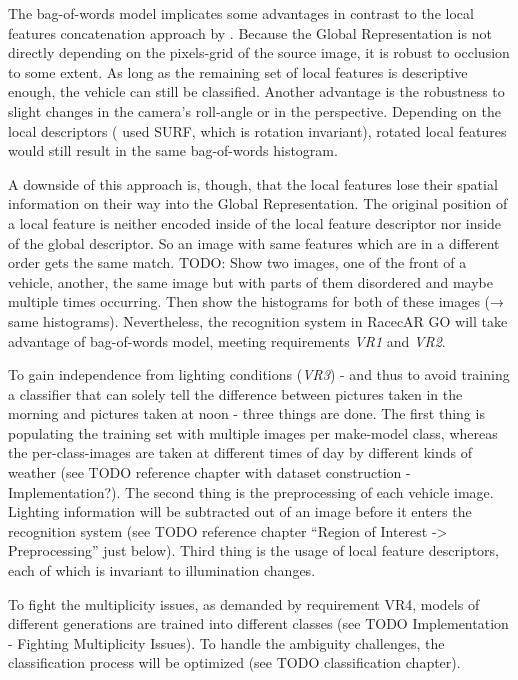 The bag-of-words model implicates some advantages in contrast to the local features concatenation approach by \citeauthor{petrovic2004analysis}. Because the Global Representation is not directly depending on the pixels-grid of the source image, it is robust to occlusion to some extent. As long as the remaining set of local features is descriptive enough, the vehicle can still be classified. Another advantage is the robustness to slight changes in the camera's roll-angle or in the perspective. Depending on the local descriptors (\citeauthor{siddiqui2015robust} used SURF, which is rotation invariant), rotated local features would still result in the same bag-of-words histogram.

A downside of this approach is, though, that the local features lose their spatial information on their way into the Global Representation. The original position of a local feature is neither encoded inside of the local feature descriptor nor inside of the global descriptor. So an image with same features which are in a different order gets the same match. TODO: Show two images, one of the front of a vehicle, another, the same image but with parts of them disordered and maybe multiple times occurring. Then show the histograms for both of these images (→ same histograms). Nevertheless, the recognition system in RacecAR GO will take advantage of bag-of-words model, meeting requirements \emph{VR1} and \emph{VR2}.

To gain independence from lighting conditions (\emph{VR3}) - and thus to avoid training a classifier that can solely tell the difference between pictures taken in the morning and pictures taken at noon - three things are done. The first thing is populating the training set with multiple images per make-model class, whereas the per-class-images are taken at different times of day by different kinds of weather (see TODO reference chapter with dataset construction - Implementation?). The second thing is the preprocessing of each vehicle image. Lighting information will be subtracted out of an image before it enters the recognition system (see TODO reference chapter “Region of Interest -> Preprocessing” just below). Third thing is the usage of local feature descriptors, each of which is invariant to illumination changes.

To fight the multiplicity issues, as demanded by requirement VR4, models of different generations are trained into different classes (see TODO Implementation - Fighting Multiplicity Issues). To handle the ambiguity challenges, the classification process will be optimized (see TODO classification chapter).

